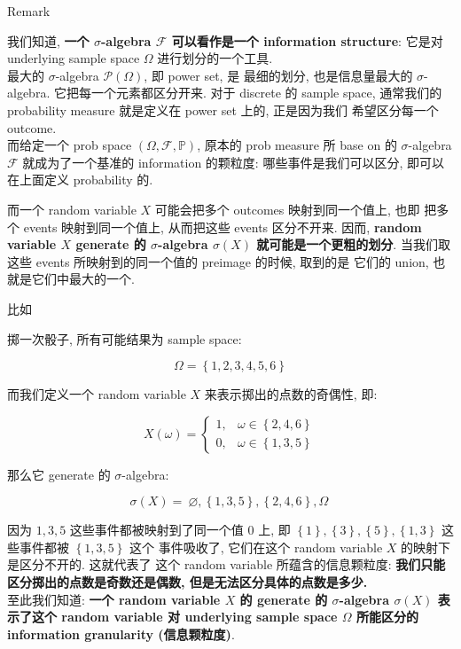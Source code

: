 \documentclass{qlnotes-export}
\begin{document}
\begin{qlremark}{Remark}

我们知道, \textbf{一个 \(\sigma\)-algebra \(\mathcal{F}\) 可以看作是一个 information structure}: 它是对 underlying sample space \(\Omega\) 进行划分的一个工具.\\
最大的 \(\sigma\)-algebra \(\mathcal{P}(\Omega)\), 即 power set, 是 最细的划分, 也是信息量最大的 \(\sigma\)-algebra. 它把每一个元素都区分开来. 对于 discrete 的 sample space, 通常我们的 probability measure 就是定义在 power set 上的, 正是因为我们 希望区分每一个 outcome.\\
而给定一个 prob space \((\Omega,\mathcal{F},{\mathbb{P}})\), 原本的 prob measure 所 base on 的 \(\sigma\)-algebra \(\mathcal{F}\) 就成为了一个基准的 information 的颗粒度: 哪些事件是我们可以区分, 即可以在上面定义 probability 的.

而一个 random variable \(X\) 可能会把多个 outcomes 映射到同一个值上, 也即 把多个 events 映射到同一个值上, 从而把这些 events 区分不开来. 因而, \textbf{random variable \(X\) generate 的 \(\sigma\)-algebra \(\sigma(X)\) 就可能是一个更粗的划分}. 当我们取这些 events 所映射到的同一个值的 preimage 的时候, 取到的是 它们的 union, 也就是它们中最大的一个.

比如

\begin{example}

掷一次骰子, 所有可能结果为 sample space:

\[\Omega = \left\{ {1,2,3,4,5,6} \right\}\]

而我们定义一个 random variable \(X\) 来表示掷出的点数的奇偶性, 即:

\[X(\omega) = \left\{ \begin{matrix}
{1,} & {\omega \in \left\{ {2,4,6} \right\}} \\
{0,} & {\omega \in \left\{ {1,3,5} \right\}}
\end{matrix} \right.\]

那么它 generate 的 \(\sigma\)-algebra:

\[\sigma(X) = \ \varnothing,\left\{ {1,3,5} \right\},\left\{ {2,4,6} \right\},\Omega\ \]

因为 \(1,3,5\) 这些事件都被映射到了同一个值 \(0\) 上, 即 \(\left\{ 1 \right\},\left\{ 3 \right\},\left\{ 5 \right\},\left\{ {1,3} \right\}\) 这些事件都被 \(\left\{ {1,3,5} \right\}\) 这个 事件吸收了, 它们在这个 random variable \(X\) 的映射下是区分不开的. 这就代表了 这个 random variable 所蕴含的信息颗粒度: \textbf{我们只能区分掷出的点数是奇数还是偶数, 但是无法区分具体的点数是多少.}\\
至此我们知道: \textbf{一个 random variable \(X\) 的 generate 的 \(\sigma\)-algebra \(\sigma(X)\) 表示了这个 random variable 对 underlying sample space \(\Omega\) 所能区分的 information granularity (信息颗粒度)}.\\

\end{example}

\end{qlremark}
\end{document}
